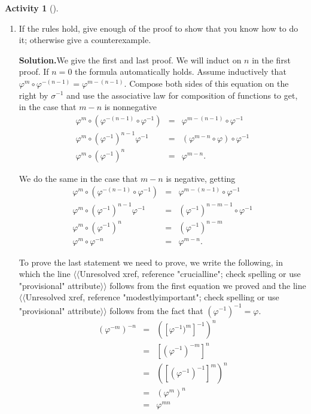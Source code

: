 \documentclass[10pt,]{book}
\theoremstyle{plain}
\theoremstyle{definition}
\newtheorem{activity}[project]{Activity}
\numberwithin{equation}{chapter}
\newcommand{\amp}{&}
\begin{document}
\begin{activity}[]
\begin{enumerate}[label=(\alph*)]
~\par
\item If the rules hold, give enough of the proof to show that you know how to do it; otherwise give a counterexample.%
\par\medskip\noindent%
\textbf{Solution.}\quad We give the first and last proof. We will induct on \(n\) in the first proof. If \(n=0\) the formula automatically holds. Assume inductively that \(\varphi^m\circ\varphi^{-(n-1)} = \varphi^{m-(n-1)}\). Compose both sides of this equation on the right by \(\sigma^{-1}\) and use the associative law for composition of functions to get, in the case that \(m-n\) is nonnegative%
\begin{align*}
\varphi^m\circ(\varphi^{-(n-1)}\circ\varphi^{-1}) \amp =\amp
\varphi^{m-(n-1)}\circ\varphi^{-1}\\
\varphi^m\circ(\varphi^{-1})^{n-1}\varphi^{-1}\amp =\amp
(\varphi^{m-n}\circ\varphi)\circ\varphi^{-1}\\
\varphi^m\circ(\varphi^{-1})^n \amp =\amp  \varphi^{m-n}.
\end{align*}
%
\par
We do the same in the case that \(m-n\) is negative, getting%
\begin{align*}
\varphi^m\circ(\varphi^{-(n-1)}\circ\varphi^{-1}) \amp =\amp
\varphi^{m-(n-1)}\circ\varphi^{-1}\\
\varphi^m\circ(\varphi^{-1})^{n-1}\varphi^{-1}\amp =\amp
(\varphi^{-1})^{n-m-1}\circ\varphi^{-1}\\
\varphi^m\circ(\varphi^{-1})^n \amp =\amp  (\varphi^{-1})^{n-m}\\
\varphi^m\circ\varphi^{-n}\amp =\amp \varphi^{m-n}.
\end{align*}
%
\par
To prove the last statement we need to prove, we write the following, in which the line {$\langle\langle$Unresolved xref, reference "crucialline"; check spelling or use "provisional" attribute$\rangle\rangle$} follows from the first equation we proved and the line {$\langle\langle$Unresolved xref, reference "modestlyimportant"; check spelling or use "provisional" attribute$\rangle\rangle$} follows from the fact that \((\varphi^{-1})^{-1} = \varphi\).%
\begin{align*}
(\varphi^{-m})^{-n} \amp =\amp  ([\varphi^{-1})^m]^{-1})^n\nonumber\\
\amp =\amp [(\varphi^{-1})^{-m}]^n\\
\amp =\amp ([(\varphi^{-1})^{-1}]^m)^n\nonumber\\
\amp =\amp (\varphi^m)^n\\
\amp =\amp \varphi^{mn}\nonumber
\end{align*}
%

\end{enumerate}
\end{activity}
\end{document}
